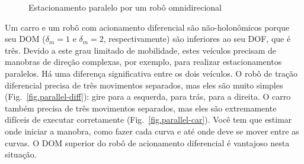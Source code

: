 \begin{figure}
\begin{center}
\end{center}
\caption{Estacionamento paralelo por um robô omnidirecional}\label{fig.parallel-omni}
\end{figure}

Um carro e um robô com acionamento diferencial são não-holonômicos porque seu DOM ($\delta_m=1$ e $\delta_m=2$, respectivamente) são inferiores ao seu DOF, que é três. Devido a este grau limitado de mobilidade, estes veículos precisam de manobras de direção complexas, por exemplo, para realizar estacionamentos paralelos. Há uma diferença significativa entre os dois veículos. O robô de tração diferencial precisa de três movimentos separados, mas eles são muito simples (Fig.~\ref{fig.parallel-diff}): gire para a esquerda, para trás, para a direita. O carro também precisa de três movimentos separados, mas eles são extremamente difíceis de executar corretamente (Fig.~\ref{fig.parallel-car}). Você tem que estimar onde iniciar a manobra, como fazer cada curva e até onde deve se mover entre as curvas. O DOM superior do robô de acionamento diferencial é vantajoso nesta situação.

